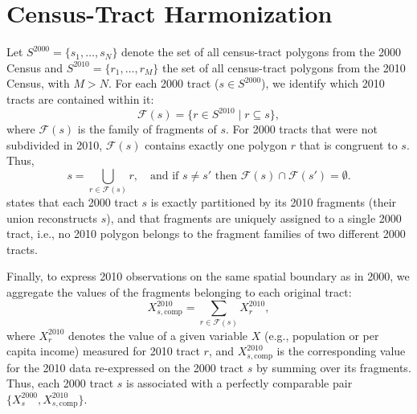 \appendix


\section{Census-Tract Harmonization}
\label{s:appendix_harmonization}

Let $S^{2000} = \{s_{1},\ldots,s_{N}\}$ denote the set of all census-tract polygons from the 2000 Census and $S^{2010} = \{r_{1}, \ldots, r_{M}\}$ the set of all census-tract polygons from the 2010 Census, with $M > N$. For each 2000 tract ($s \in S^{2000}$), we identify which 2010 tracts are contained within it:
\begin{equation}
    \mathcal{F}(s) = \{r \in S^{2010} \mid r \subseteq s\},
    \label{eq:data1}
\end{equation}
where $\mathcal{F}(s)$ is the family of fragments of $s$. For 2000 tracts that were not subdivided in 2010, $\mathcal{F}(s)$ contains exactly one polygon $r$ that is congruent to $s$. Thus,
\begin{equation}
    s = \bigcup_{r \in \mathcal{F}(s)} r, \quad \text{and if } s \neq s' \text{ then } \mathcal{F}(s) \cap \mathcal{F}(s') = \emptyset.
    \label{eq:data2}
\end{equation}
states that each 2000 tract $s$ is exactly partitioned by its 2010 fragments (their union reconstructs $s$), and that fragments are uniquely assigned to a single 2000 tract, i.e., no 2010 polygon belongs to the fragment families of two different 2000 tracts.

Finally, to express 2010 observations on the same spatial boundary as in 2000, we aggregate the values of the fragments belonging to each original tract:
\begin{equation}
    X_{s,\mathrm{comp}}^{2010} = \sum_{r \in \mathcal{F}(s)} X_{r}^{2010},
    \label{eq:data3}
\end{equation}
where $X_{r}^{2010}$ denotes the value of a given variable $X$ (e.g., population or per capita income) measured for 2010 tract $r$, and $X_{s,\mathrm{comp}}^{2010}$ is the corresponding value for the 2010 data re-expressed on the 2000 tract $s$ by summing over its fragments. Thus, each 2000 tract $s$ is associated with a perfectly comparable pair $\{X_{s}^{2000}, X_{s,\mathrm{comp}}^{2010}\}$.

